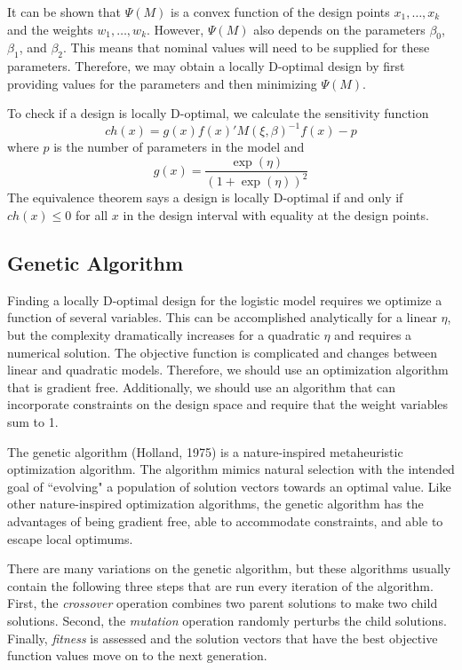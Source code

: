 \documentclass[11pt,a4paper]{article}
\begin{document}
It can be shown that $\Psi(M)$ is a convex function of the design points $x_1, \dots, x_k$ and  the weights $w_1, \dots, w_k$. However, $\Psi(M)$ also depends on the parameters $\beta_0$, $\beta_1$, and $\beta_2$. This means that nominal values will need to be supplied for these parameters. Therefore, we may obtain a locally D-optimal design by first providing values for the parameters and then minimizing $\Psi(M)$.

To check if a design is locally D-optimal, we calculate the sensitivity function
$$
ch(x) = g(x) f(x)'M(\xi, \beta)^{-1} f(x) - p
$$
where $p$ is the number of parameters in the model and
$$
g(x) = \frac{\exp(\eta)}{(1+\exp(\eta))^2}
$$
The equivalence theorem says a design is locally D-optimal if and only if $ch(x) \leq 0 $ for all $x$ in the design interval with equality at the design points.


\subsection{Genetic Algorithm}
Finding a locally D-optimal design for the logistic model requires we optimize a function of several variables. This can be accomplished analytically for a linear $\eta$, but the complexity dramatically increases for a quadratic $\eta$ and requires a numerical solution. The objective function is complicated and changes between linear and quadratic models. Therefore, we should use an optimization algorithm that is gradient free. Additionally, we should use an algorithm that can incorporate constraints on the design space and require that the weight variables sum to 1.

The genetic algorithm (Holland, 1975) is a nature-inspired metaheuristic optimization algorithm. The algorithm mimics natural selection with the intended goal of ``evolving" a population of solution vectors towards an optimal value. Like other nature-inspired optimization algorithms, the genetic algorithm has the advantages of being gradient free, able to accommodate constraints, and able to escape local optimums. 

There are many variations on the genetic algorithm, but these algorithms usually contain the following three steps that are run every iteration of the algorithm. First, the \textit{crossover} operation combines two parent solutions to make two child solutions. Second, the \textit{mutation} operation randomly perturbs the child solutions. Finally, \textit{fitness} is assessed and the solution vectors that have the best objective function values move on to the next generation.
\end{document}

